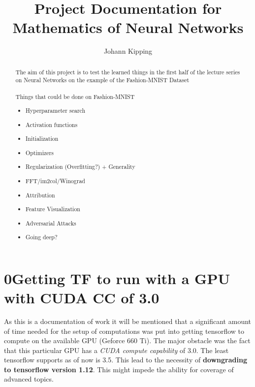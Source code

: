 \documentclass[]{article}
\title{Project Documentation for \\Mathematics of Neural Networks}
\author{Johann Kipping}
\begin{document}
\maketitle

\begin{abstract}
The aim of this project is to test the learned things in the first half of the lecture series on Neural Networks on the example of the Fashion-MNIST Dataset\\
\\
Things that could be done on Fashion-MNIST
\begin{itemize}
	\item Hyperparameter search
	\item Activation functions
	\item Initialization
	\item Optimizers
	\item Regularization (Overfitting?) + Generality
	\item FFT/im2col/Winograd
	\item Attribution
	\item Feature Visualization
	\item Adversarial Attacks
	\item Going deep?
\end{itemize}
\end{abstract}

\section*{0\quad Getting TF to run with a GPU with CUDA CC of 3.0}
As this is a documentation of work it will be mentioned that a significant amount of time needed for the setup of computations was put into getting tensorflow to compute on the available GPU (Geforce 660 Ti). The major obstacle was the fact that this particular GPU has a \textit{CUDA compute capability} of 3.0. The least tensorflow supports as of now is 3.5. This lead to the necessity of \textbf{downgrading to tensorflow version 1.12}. This might impede the ability for coverage of advanced topics.
\end{document}
